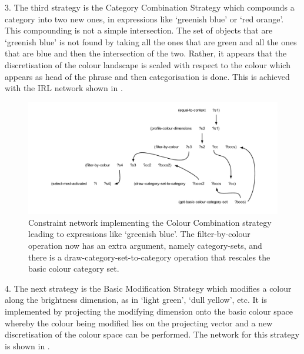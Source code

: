 3. The third strategy is the {\bfshape Category Combination Strategy} which compounds a category into two new ones, in 
expressions like `greenish blue' or `red orange'. This compounding is not a simple intersection. The set of objects  
that are `greenish blue' is not found by taking all the ones that are green and all the ones that are blue and then 
the intersection of the two. Rather, it appears that the discretisation of the colour landscape is scaled with respect 
to the colour which appears as head of the phrase and then categorisation is done. This is achieved with the IRL network 
shown in . 

\begin{figure}[htbp]
  \centerline{\includegraphics[width=1.0\textwidth]{chap11/figs/combi.pdf}}
\caption{\label{fig:combi}Constraint network implementing the Colour Combination strategy leading to expressions like `greenish blue'. 
The filter-by-colour operation now has an extra argument, namely category-sets,  
and there is a draw-category-set-to-category operation that rescales the basic colour category set.}
\end{figure}

4. The next strategy is the {\bfshape Basic Modification Strategy} which modifies a colour along the brightness dimension, as in 
`light green', `dull yellow', etc. It is implemented by projecting the modifying dimension onto the basic colour space 
whereby the colour being modified lies on the projecting vector and a new discretisation of the colour space can be 
performed. The network for this strategy is shown in . 

